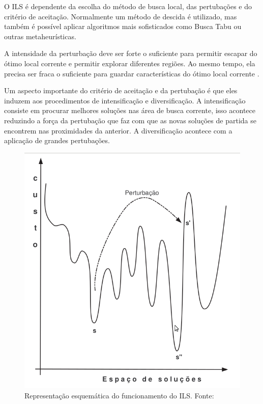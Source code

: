 O ILS é dependente da escolha do método de busca local, das pertubações e do critério de aceitação. Normalmente um método de descida é utilizado, mas também é possível aplicar algoritmos mais sofisticados como Busca Tabu ou outras metaheurísticas.

A intensidade da perturbação deve ser forte o suficiente para permitir escapar do ótimo
local corrente e permitir explorar diferentes regiões. Ao mesmo tempo, ela precisa ser fraca
o suficiente para guardar características do ótimo local corrente \cite{notasmarcone}.

Um aspecto importante do critério de aceitação e da pertubação é que eles induzem aos procedimentos de intensificação e diversificação. A intensificação consiste em procurar melhores soluções nas área de busca corrente, isso acontece reduzindo a força da pertubação que faz com que as novas soluções de partida se encontrem nas proximidades da anterior. A diversificação acontece com a aplicação de grandes pertubações.

\begin{figure}[ht]
	\caption{Representação esquemática do funcionamento do ILS. \newline
	\mbox{Fonte:
	\cite{notasmarcone}}}
	\label{img:ilsfuncionamento}
	\includegraphics[scale=0.3]{./img/ilsfuncionamento.png}
\end{figure}

